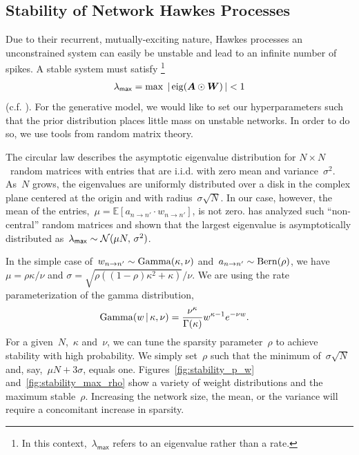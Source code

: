 \subsection{Stability of Network Hawkes Processes}
\label{sec:stability}


Due to their recurrent, mutually-exciting nature, Hawkes processes
an unconstrained system can easily be unstable and lead to an infinite 
number of spikes. A stable system must satisfy \footnote{In
  this context,~${\lambda_{\mathsf{max}}}$ refers to an eigenvalue
  rather than a rate.}
\begin{align*}
  \lambda_{\mathsf{max}}=\max\; |\,\mathrm{eig}(\boldsymbol{A}\odot\boldsymbol{W})\,| < 1
\end{align*}
(c.f. \citet{Daley-1988}).
For the generative model, we would like
to set our hyperparameters such that the prior distribution places
little mass on unstable networks. In order to do so, we use tools from
random matrix theory.

The circular law describes the asymptotic eigenvalue distribution for
$N \times N$~random matrices with entries that are i.i.d. with zero
mean and variance~$\sigma^2$. As~$N$ grows, the eigenvalues are
uniformly distributed over a disk in the complex plane centered at the
origin and with radius~$\sigma\sqrt{N}$. In our case, however, the
mean of the entries,~${\mu=\mathbb{E}[a_{n \to n'} \cdot w_{n \to
      n'}]}$, is not zero. \citet{Silverstein-1994} has analyzed such
``non-central'' random matrices and shown that the largest eigenvalue
is asymptotically distributed
as~${\lambda_{\sf{max}} \sim \mathcal{N}(\mu N,\, \sigma^2)}$.

In the simple case of~${w_{n \to n'}\sim \mathrm{Gamma}(\kappa,\nu)}$
and~${a_{n \to n'}\sim\mathrm{Bern}(\rho)}$, we have
${\mu = \rho \kappa/\nu}$ and
${\sigma=\sqrt{\rho((1-\rho)\kappa^2+\kappa)}/\nu}$. We are using the 
rate parameterization of the gamma distribution, 
\begin{align*}
\mathrm{Gamma}(w \,|\, \kappa, \nu) &= \frac{\nu^{\kappa}}{\Gamma(\kappa)}w^{\kappa- 1} e^{-\nu w}.
\end{align*}
For a
given~$N$,~$\kappa$ and~$\nu$, we can tune the sparsity
parameter~$\rho$ to achieve stability with high probability. We simply
set~$\rho$ such that the minimum of~$\sigma\sqrt{N}$ and,
say,~${\mu N + 3\sigma}$, equals one. Figures~\ref{fig:stability_p_w}
and~\ref{fig:stability_max_rho} show a variety of weight distributions
and the maximum stable~$\rho$. Increasing the network size, the mean,
or the variance will require a concomitant increase in sparsity.

